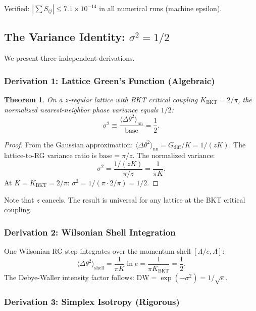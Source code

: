 \documentclass[aps,prd,onecolumn,superscriptaddress,floatfix,12pt]{revtex4-2}
\newcommand{\KBKT}{K_{\text{BKT}}}
\newcommand{\Gdiff}{G_{\text{diff}}}
\newtheorem{theorem}{Theorem}[section]
\begin{document}
Verified: $|\sum S_{ij}| \leq 7.1 \times 10^{-14}$ in all numerical runs (machine epsilon).

\subsection{The Variance Identity: $\sigma^2 = 1/2$}\label{sec:A6}

We present three independent derivations.

\subsubsection{Derivation 1: Lattice Green's Function (Algebraic)}

\begin{theorem}
On a $z$-regular lattice with BKT critical coupling $\KBKT = 2/\pi$, the normalized nearest-neighbor phase variance equals $1/2$:
\begin{equation}
\sigma^2 \equiv \frac{\langle\Delta\theta^2\rangle_{\text{nn}}}{\text{base}} = \frac{1}{2}.
\end{equation}
\end{theorem}

\begin{proof}
From the Gaussian approximation: $\langle\Delta\theta^2\rangle_{\text{nn}} = \Gdiff/K = 1/(zK)$. The lattice-to-RG variance ratio is $\text{base} = \pi/z$. The normalized variance:
\[
\sigma^2 = \frac{1/(zK)}{\pi/z} = \frac{1}{\pi K}.
\]
At $K = \KBKT = 2/\pi$: $\sigma^2 = 1/(\pi \cdot 2/\pi) = 1/2$.
\end{proof}

Note that $z$ cancels. The result is universal for any lattice at the BKT critical coupling.

\subsubsection{Derivation 2: Wilsonian Shell Integration}

One Wilsonian RG step integrates over the momentum shell $[\Lambda/e, \Lambda]$:
\[
\langle\Delta\theta^2\rangle_{\text{shell}} = \frac{1}{\pi K}\ln e = \frac{1}{\pi \KBKT} = \frac{1}{2}.
\]
The Debye-Waller intensity factor follows: $\text{DW} = \exp(-\sigma^2) = 1/\sqrt{e}$.

\subsubsection{Derivation 3: Simplex Isotropy (Rigorous)}
\end{document}
